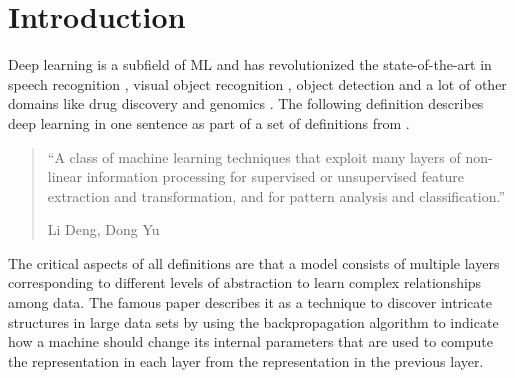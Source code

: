 \chapter{Introduction}
\label{chap:introduction}
Deep learning is a subfield of \acf{ML} and has revolutionized the state-of-the-art in speech recognition \cite{gaikwad2010review}, visual object recognition \cite{eitel2015multimodal}, object detection \cite{zhao2019object} and a lot of other domains like drug discovery \cite{chen2018rise} and genomics \cite{zou2019primer}. The following definition describes deep learning in one sentence as part of a set of definitions from \cite{deng2014deep}.
\begin{quote}
    ``A class of machine learning techniques that exploit many layers of non-linear information processing for supervised or unsupervised feature extraction and transformation, and for pattern analysis and classification.''
    \begin{minipage}[t]{0.55\textwidth}
      \hfill Li Deng, Dong Yu \cite{deng2014deep}
    \end{minipage}
  \end{quote}

  The critical aspects of all definitions are that a model consists of multiple layers corresponding to different levels of abstraction to learn complex relationships among data. The famous paper  \cite{LeCun2015} describes it as a technique to discover intricate structures in large data sets by using the backpropagation algorithm to indicate how a machine should change its internal parameters that are used to compute the representation in each layer from the representation in the previous layer.

